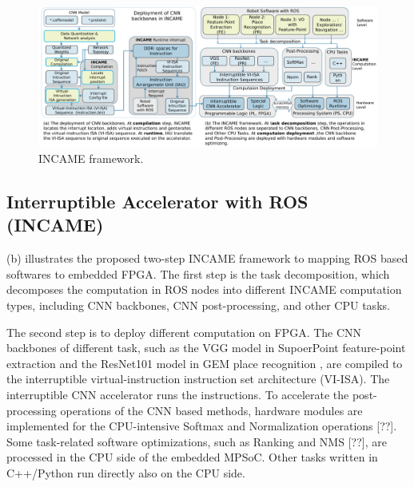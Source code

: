 \begin{figure}[t]
	\centering
    \includegraphics[width=0.99\linewidth]{fig/incame.pdf}
    \caption{ INCAME framework.}
	\label{fig:incame}
\end{figure}

\subsection{ Interruptible Accelerator with ROS (INCAME) }


(b) illustrates the proposed two-step INCAME framework to mapping ROS based softwares to embedded FPGA.
The first step is the task decomposition, which decomposes the computation in ROS nodes into different INCAME computation types, including CNN backbones, CNN post-processing, and other CPU tasks. 

The second step is to deploy different computation on FPGA. 
The CNN backbones of  different task, such as the VGG model \cite{kim2016accurate} in SupoerPoint feature-point extraction \cite{detone2018superpoint} and the ResNet101 model \cite{he2016deep} in GEM place recognition \cite{radenovic2018fine}, are compiled to the interruptible virtual-instruction instruction set architecture (VI-ISA). 
The interruptible CNN accelerator runs the instructions.
To accelerate the post-processing operations of the CNN based methods, hardware modules are implemented for the CPU-intensive Softmax and Normalization operations [??]. Some task-related software optimizations, such as Ranking and NMS [??], are processed in the CPU side of the embedded MPSoC\cite{MPSoC}.
Other tasks written in C++/Python run directly also on the CPU side.

